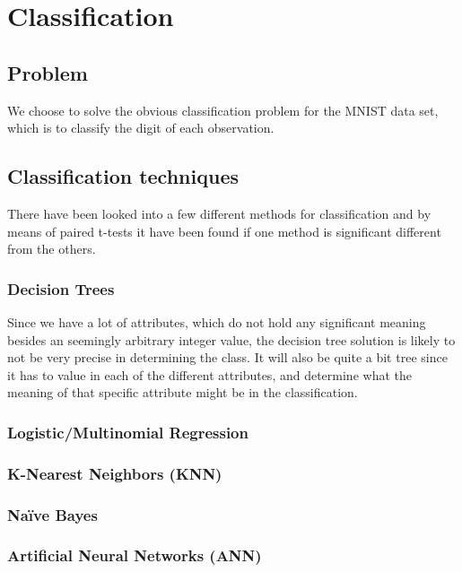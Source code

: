 \chapter{Classification}

\section{Problem}
We choose to solve the obvious classification problem for the MNIST data set, which is to classify the digit of each observation. 

\section{Classification techniques}
There have been looked into a few different methods for classification and by means of paired t-tests it have been found if one method is significant different from the others.

\subsection{Decision Trees}
Since we have a lot of attributes, which do not hold any significant meaning besides an seemingly arbitrary integer value, the decision tree solution is likely to not be very precise in determining the class. It will also be quite a bit tree since it has to value in each  of the different attributes, and determine what the meaning of that specific attribute might be in the classification.


\subsection{Logistic/Multinomial Regression}
\subsection{K-Nearest Neighbors (KNN)}


\subsection{Naïve Bayes}
\subsection{Artificial Neural Networks (ANN)}


